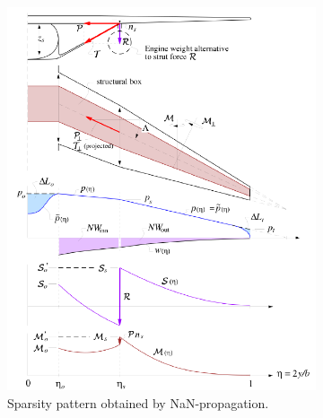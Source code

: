 \begin{figure}[H]
    \centering
    \begin{subfigure}{0.49\textwidth}
        \centering
        \includegraphics[page=10, width=\textwidth]{../figures/nan-propagation/cropped.pdf}
        \caption{Sparsity pattern obtained by NaN-propagation.}
    \end{subfigure}
    \begin{subfigure}{0.49\textwidth}
        \centering

\end{subfigure}
\end{figure}
